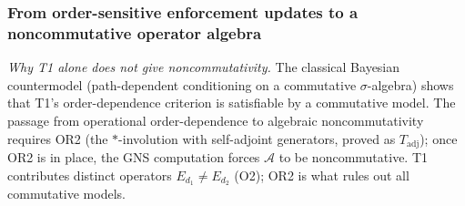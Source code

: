 \documentclass[11pt]{article}
\theoremstyle{remark}
\begin{document}
\subsubsection*{From order-sensitive enforcement updates to a noncommutative operator algebra}

\smallskip\noindent\textit{Why T1 alone does not give noncommutativity.}  The classical Bayesian countermodel (path-dependent conditioning on a commutative $\sigma$-algebra) shows that T1's order-dependence criterion is satisfiable by a commutative model.  The passage from operational order-dependence to algebraic noncommutativity requires OR2 (the $*$-involution with self-adjoint generators, proved as $T_{\mathrm{adj}}$); once OR2 is in place, the GNS computation forces $\mathcal{A}$ to be noncommutative.  T1 contributes distinct operators $E_{d_1} \ne E_{d_2}$ (O2); OR2 is what rules out all commutative models.
\end{document}
